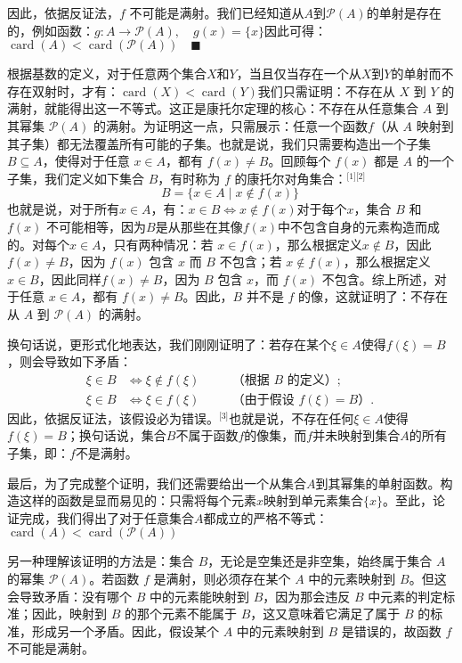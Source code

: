 因此，依据反证法，$f$ 不可能是满射。我们已经知道从$A$到$\mathcal{P}(A)$的单射是存在的，例如函数：$g: A \to \mathcal{P}(A), \quad g(x) = \{x\}$因此可得：$\operatorname{card}(A) < \operatorname{card}(\mathcal{P}(A)) \quad \blacksquare$

根据基数的定义，对于任意两个集合$X$和$Y$，当且仅当存在一个从$X$到$Y$的单射而不存在双射时，才有：$\operatorname{card}(X) < \operatorname{card}(Y)$我们只需证明：不存在从 $X$ 到 $Y$ 的满射，就能得出这一不等式。这正是康托尔定理的核心：不存在从任意集合 $A$ 到其幂集 $\mathcal{P}(A)$ 的满射。为证明这一点，只需展示：任意一个函数$f$（从 $A$ 映射到其子集）都无法覆盖所有可能的子集。也就是说，我们只需要构造出一个子集 $B \subseteq A$，使得对于任意 $x \in A$，都有 $f(x) \neq B$。回顾每个 $f(x)$ 都是 $A$ 的一个子集，我们定义如下集合 $B$，有时称为 $f$ 的康托尔对角集合：\(^\text{[1][2]}\)
$$
B = \{x \in A \mid x \notin f(x)\}~
$$
也就是说，对于所有$x \in A$，有：$x \in B \iff x \notin f(x)$对于每个$x$，集合 $B$ 和 $f(x)$ 不可能相等，因为$B$是从那些在其像$f(x)$中不包含自身的元素构造而成的。对每个$x \in A$，只有两种情况：若 $x \in f(x)$，那么根据定义$x \notin B$，因此$f(x) \neq B$，因为 $f(x)$ 包含 $x$ 而 $B$ 不包含；若 $x \notin f(x)$，那么根据定义 $x \in B$，因此同样$f(x)\neq B$，因为 $B$ 包含 $x$，而 $f(x)$ 不包含。综上所述，对于任意 $x \in A$，都有 $f(x) \neq B$。因此，$B$ 并不是 $f$ 的像，这就证明了：不存在从 $A$ 到 $\mathcal{P}(A)$ 的满射。

换句话说，更形式化地表达，我们刚刚证明了：若存在某个$\xi \in A$使得$f(\xi) = B$，则会导致如下矛盾：
$$
\begin{aligned}
\xi \in B &\iff \xi \notin f(\xi) \quad &&\text{（根据 } B \text{ 的定义）}; \\
\xi \in B &\iff \xi \in f(\xi) \quad &&\text{（由于假设 } f(\xi) = B \text{）}.
\end{aligned}~
$$
因此，依据反证法，该假设必为错误。\(^\text{[3]}\)也就是说，不存在任何$\xi \in A$使得
$f(\xi) = B$；换句话说，集合$B$不属于函数$f$的像集，而$f$并未映射到集合$A$的所有子集，即：$f$不是满射。

最后，为了完成整个证明，我们还需要给出一个从集合$A$到其幂集的单射函数。构造这样的函数是显而易见的：只需将每个元素$x$映射到单元素集合$\{x\}$。至此，论证完成，我们得出了对于任意集合$A$都成立的严格不等式：$\operatorname{card}(A) <\operatorname{card}(\mathcal{P}(A))$

另一种理解该证明的方法是：集合 $B$，无论是空集还是非空集，始终属于集合 $A$ 的幂集 $\mathcal{P}(A)$。若函数 $f$ 是满射，则必须存在某个 $A$ 中的元素映射到 $B$。但这会导致矛盾：没有哪个 $B$ 中的元素能映射到 $B$，因为那会违反 $B$ 中元素的判定标准；因此，映射到 $B$ 的那个元素不能属于 $B$，这又意味着它满足了属于 $B$ 的标准，形成另一个矛盾。因此，假设某个 $A$ 中的元素映射到 $B$ 是错误的，故函数 $f$ 不可能是满射。

